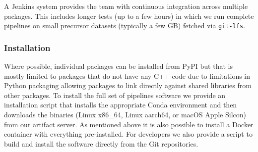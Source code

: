 A Jenkins system provides the team with continuous integration across multiple packages.
This includes longer tests (up to a few hours) in which we run complete pipelines on small precursor datasets (typically a few GB) fetched via \texttt{git-lfs}.

\subsubsection{Installation}

Where possible, individual packages can be installed from PyPI but that is mostly limited to packages that do not have any C++ code due to limitations in Python packaging allowing packages to link directly against shared libraries from other packages.
To install the full set of pipelines software we provide an installation script that installs the appropriate Conda environment and then downloads the binaries (Linux x86\_64, Linux aarch64, or macOS Apple Silcon) from our artifact server.
As mentioned above it is also possible to install a Docker container with everything pre-installed.
For developers we also provide a script to build and install the software directly from the Git repositories.
